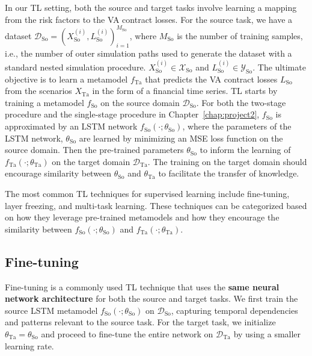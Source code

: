 In our TL setting, both the source and target tasks involve learning a mapping from the risk factors to the VA contract losses.
For the source task, we have a dataset $\mathcal{D}_{\text{So}} = { (X_{\text{So}}^{(i)}, L_{\text{So}}^{(i)}) }_{i=1}^{M_{\text{So}}}$, where $M_{\text{So}}$ is the number of training samples, i.e., the number of outer simulation paths used to generate the dataset with a standard nested simulation procedure.
$X_{\text{So}}^{(i)} \in \mathcal{X}_{\text{So}}$ and $L_{\text{So}}^{(i)} \in \mathcal{Y}_{\text{So}}$.
The ultimate objective is to learn a metamodel $f_{\text{Ta}}$ that predicts the VA contract losses $L_{\text{So}}$ from the scenarios $X_{\text{Ta}}$ in the form of a financial time series.
TL starts by training a metamodel $f_{\text{So}}$ on the source domain $\mathcal{D}_{\text{So}}$.
For both the two-stage procedure and the single-stage procedure in Chapter~\ref{chap:project2}, $f_{\text{So}}$ is approximated by an LSTM network $f_{\text{So}}(\cdot ; \theta_{\text{So}})$, where the parameters of the LSTM network, $\theta_{\text{So}}$ are learned by minimizing an MSE loss function on the source domain.
Then the pre-trained parameters $\theta_{\text{So}}$ to inform the learning of $f_{\text{Ta}}(\cdot ; \theta_{\text{Ta}})$ on the target domain $\mathcal{D}_{\text{Ta}}$.
The training on the target domain should encourage similarity between $\theta_{\text{So}}$ and $\theta_{\text{Ta}}$ to facilitate the transfer of knowledge.

The most common TL techniques for supervised learning include fine-tuning, layer freezing, and multi-task learning. 
These techniques can be categorized based on how they leverage pre-trained metamodels and how they encourage the similarity between $f_{\text{So}}(\cdot ; \theta_{\text{So}})$ and $f_{\text{Ta}}(\cdot ; \theta_{\text{Ta}})$.

\subsection{Fine-tuning}

Fine-tuning is a commonly used TL technique that uses the \textbf{same neural network architecture} for both the source and target tasks.
We first train the source LSTM metamodel $f_{\text{So}}(\cdot; \theta_{\text{So}})$ on $\mathcal{D}_{\text{So}}$, capturing temporal dependencies and patterns relevant to the source task. 
For the target task, we initialize $\theta_{\text{Ta}} = \theta_{\text{So}}$ and proceed to fine-tune the entire network on $\mathcal{D}_{\text{Ta}}$ by using a smaller learning rate. 

